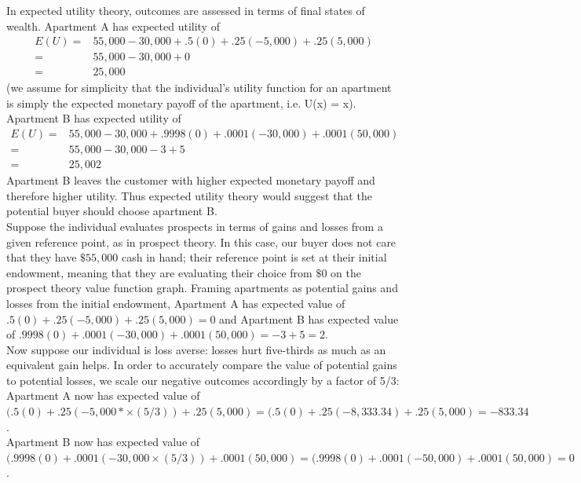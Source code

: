 \documentclass[a4paper,12pt]{article}
\numberwithin{equation}{section}
\theoremstyle{definition}
\begin{document}
In expected utility theory, outcomes are assessed in terms of final states of wealth. Apartment A has expected utility of 
\begin{eqnarray*}
E(U) =& 55,000 - 30,000 + 
.5(0)+.25(-5,000)+.25(5,000)\\
=& 55,000 - 30,000 + 0 \\
=& 25,000
\end{eqnarray*}
(we assume for simplicity that the individual's utility function for an apartment is simply the expected monetary payoff of the apartment, i.e. U(x) = x).  Apartment B has expected utility of 
\begin{eqnarray*}
E(U) =& 55,000 - 30,000 + .9998(0)+.0001(-30,000)+.0001(50,000)\\
=& 55,000 - 30,000 - 3 + 5\\
=& 25,002
\end{eqnarray*} Apartment B leaves the customer with higher expected monetary payoff and therefore higher utility. Thus expected utility theory would suggest that the potential buyer should choose apartment B.
\\

Suppose the individual evaluates prospects in terms of gains and losses from a given reference point, as in prospect theory. In this case, our buyer does not care that they have $\$55,000$ cash in hand; their reference point is set at their initial endowment, meaning that they are evaluating their choice from $\$0$ on the prospect theory value function graph. Framing apartments as potential gains and losses from the initial endowment, Apartment A has expected value of $.5(0)+.25(-5,000)+.25(5,000) = 0$ and Apartment B has expected value of $.9998(0)+.0001(-30,000)+.0001(50,000) = -3+5 = 2$.
\\

Now suppose our individual is loss averse: losses hurt five-thirds as much as an equivalent gain helps. In order to accurately compare the value of potential gains to potential losses, we scale our negative outcomes accordingly by a factor of 5/3:
\\

Apartment A now has expected value of 
$(.5(0)+.25(-5,000*\times(5/3))+.25(5,000) = (.5(0)+.25(-8,333.34)+.25(5,000) = -833.34$.
\\

Apartment B now has expected value of $(.9998(0)+.0001(-30,000\times(5/3))+.0001(50,000) = (.9998(0)+.0001(-50,000)+.0001(50,000) = 0$.
\\
\end{document}
